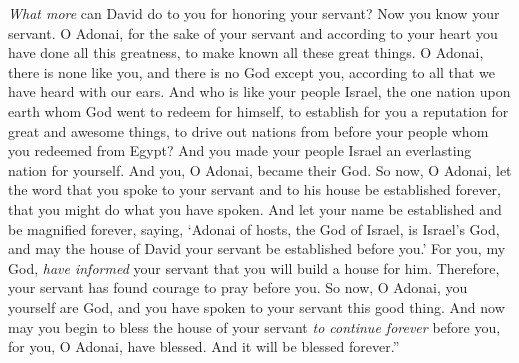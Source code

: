 \begin{biblechapter}
\verse \textit{What more} can David do to you for honoring your servant? Now you know your servant.
\verse O Adonai, for the sake of your servant and according to your heart you have done all this greatness, to make known all these great things.
\verse O Adonai, there is none like you, and there is no God except you, according to all that we have heard with our ears.
\verse And who is like your people Israel, the one nation upon earth whom God went to redeem for himself, to establish for you a reputation for great and awesome things, to drive out nations from before your people whom you redeemed from Egypt?
\verse And you made your people Israel an everlasting nation for yourself. And you, O Adonai, became their God.
\verse So now, O Adonai, let the word that you spoke to your servant and to his house be established forever, that you might do what you have spoken.
\verse And let your name be established and be magnified forever, saying, ‘Adonai of hosts, the God of Israel, is Israel’s God, and may the house of David your servant be established before you.’
\verse For you, my God, \textit{have informed} your servant that you will build a house for him. Therefore, your servant has found courage to pray before you.
\verse So now, O Adonai, you yourself are God, and you have spoken to your servant this good thing.
\verse And now may you begin to bless the house of your servant \textit{to continue forever} before you, for you, O Adonai, have blessed. And it will be blessed forever.”
\end{biblechapter}

